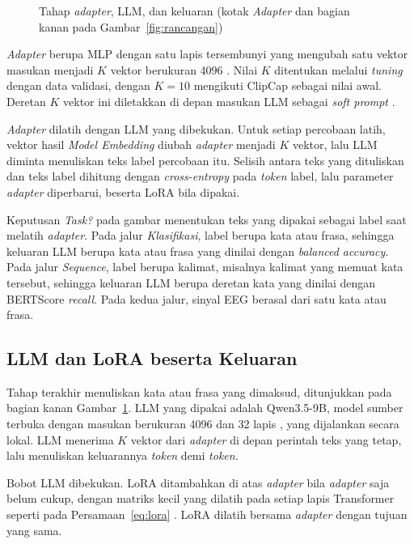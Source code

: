 \begin{figure}[H]
  \centering
  
  \caption{Tahap \textit{adapter}, LLM, dan keluaran (kotak \textit{Adapter} dan bagian kanan pada Gambar~\ref{fig:rancangan})}
  \label{fig:rancangan-adapter}
\end{figure}

\textit{Adapter} berupa MLP dengan satu lapis tersembunyi yang mengubah satu vektor masukan menjadi $K$ vektor berukuran 4096 \parencite[lihat Subbab~\ref{sec:adapter}]{mokady2021,qwen35}.
Nilai $K$ ditentukan melalui \textit{tuning} dengan data validasi, dengan $K = 10$ mengikuti ClipCap sebagai nilai awal.
Deretan $K$ vektor ini diletakkan di depan masukan LLM sebagai \textit{soft prompt} \parencite{lester2021}.

\textit{Adapter} dilatih dengan LLM yang dibekukan.
Untuk setiap percobaan latih, vektor hasil \textit{Model Embedding} diubah \textit{adapter} menjadi $K$ vektor, lalu LLM diminta menuliskan teks label percobaan itu.
Selisih antara teks yang dituliskan dan teks label dihitung dengan \textit{cross-entropy} pada \textit{token} label, lalu parameter \textit{adapter} diperbarui, beserta LoRA bila dipakai.

Keputusan \textit{Task?} pada gambar menentukan teks yang dipakai sebagai label saat melatih \textit{adapter}.
Pada jalur \textit{Klasifikasi}, label berupa kata atau frasa, sehingga keluaran LLM berupa kata atau frasa yang dinilai dengan \textit{balanced accuracy}.
Pada jalur \textit{Sequence}, label berupa kalimat, misalnya kalimat yang memuat kata tersebut, sehingga keluaran LLM berupa deretan kata yang dinilai dengan BERTScore \textit{recall}.
Pada kedua jalur, sinyal EEG berasal dari satu kata atau frasa.

\subsection{LLM dan LoRA beserta Keluaran}
\label{sec:rancangan-llm}
Tahap terakhir menuliskan kata atau frasa yang dimaksud, ditunjukkan pada bagian kanan Gambar~\ref{fig:rancangan-adapter}.
LLM yang dipakai adalah Qwen3.5-9B, model sumber terbuka dengan masukan berukuran 4096 dan 32 lapis \parencite[lihat Subbab~\ref{sec:qwen}]{qwen35}, yang dijalankan secara lokal.
LLM menerima $K$ vektor dari \textit{adapter} di depan perintah teks yang tetap, lalu menuliskan keluarannya \textit{token} demi \textit{token}.

Bobot LLM dibekukan.
LoRA ditambahkan di atas \textit{adapter} bila \textit{adapter} saja belum cukup, dengan matriks kecil yang dilatih pada setiap lapis Transformer seperti pada Persamaan~\ref{eq:lora} \parencite[lihat Subbab~\ref{sec:lora}]{hu2021}.
LoRA dilatih bersama \textit{adapter} dengan tujuan yang sama.


